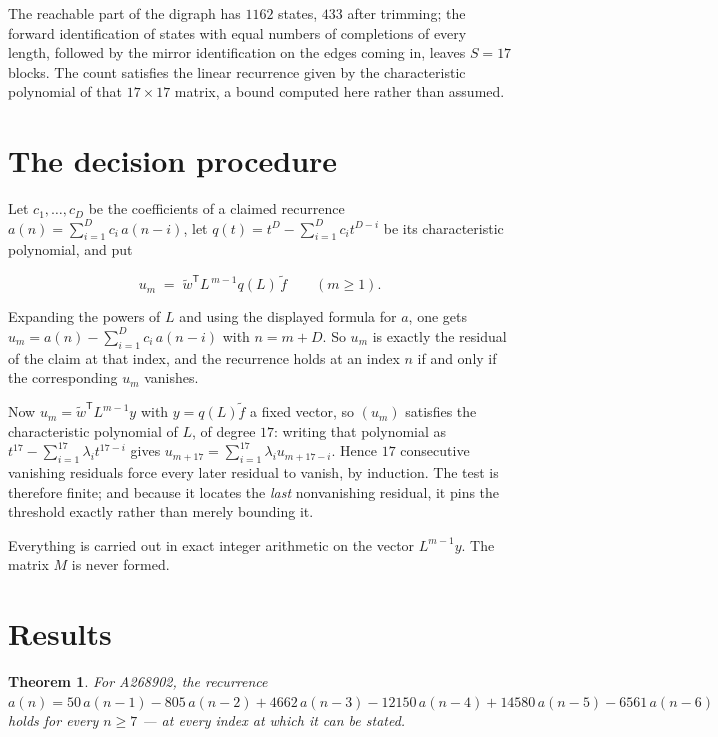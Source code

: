 \documentclass[11pt]{article}
\newtheorem{theorem}{Theorem}
\theoremstyle{definition}
\begin{document}
The reachable part of the digraph has $1162$ states, $433$ after trimming; the forward identification of states with equal numbers of completions of every length, followed by the mirror identification on the edges coming in, leaves $S = 17$ blocks. The count satisfies the linear recurrence given by the characteristic polynomial of that $17\times17$ matrix, a bound computed here rather than assumed.

\section{The decision procedure}

Let $c_1,\dots,c_D$ be the coefficients of a claimed recurrence $a(n) = \sum_{i=1}^{D} c_i\,a(n-i)$, let $q(t) = t^{D} - \sum_{i=1}^{D} c_i t^{D-i}$ be its characteristic polynomial, and put

\[u_m \;=\; \tilde w^{\mathsf T} L^{\,m-1} q(L)\,\tilde f \qquad (m \ge 1).\]

Expanding the powers of $L$ and using the displayed formula for $a$, one gets $u_m = a(n) - \sum_{i=1}^{D} c_i\,a(n-i)$ with $n = m + D$. So $u_m$ is exactly the residual of the claim at that index, and the recurrence holds at an index $n$ if and only if the corresponding $u_m$ vanishes.

Now $u_m = \tilde w^{\mathsf T} L^{m-1} y$ with $y = q(L)\tilde f$ a fixed vector, so $(u_m)$ satisfies the characteristic polynomial of $L$, of degree $17$: writing that polynomial as $t^{17} - \sum_{i=1}^{17} \lambda_i t^{17-i}$ gives $u_{m+17} = \sum_{i=1}^{17} \lambda_i u_{m+17-i}$. Hence $17$ consecutive vanishing residuals force every later residual to vanish, by induction. The test is therefore finite; and because it locates the {\itshape last} nonvanishing residual, it pins the threshold exactly rather than merely bounding it.

Everything is carried out in exact integer arithmetic on the vector $L^{m-1}y$. The matrix $M$ is never formed.

\section{Results}

\begin{theorem} For A268902, the recurrence $a(n) = 50\,a(n-1) - 805\,a(n-2) + 4662\,a(n-3) - 12150\,a(n-4) + 14580\,a(n-5) - 6561\,a(n-6)$ holds for every $n \ge 7$ --- at every index at which it can be stated.\end{theorem}
\end{document}
